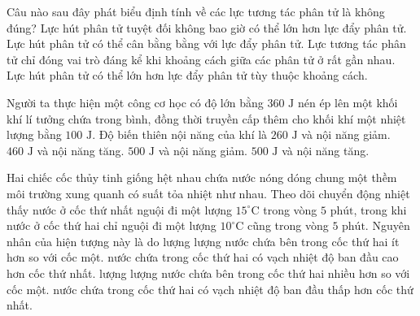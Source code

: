 \begin{ex}%
	Câu nào sau đây phát biểu định tính về các lực tương tác phân tử là không đúng?
	\choice
	{\True Lực hút phân tử tuyệt đối không bao giờ có thể lớn hơn lực đẩy phân tử.}
	{Lực hút phân tử có thể cân bằng bằng với lực đẩy phân tử.}
	{Lực tương tác phân tử chỉ đóng vai trò đáng kể khi khoảng cách giữa các phân tử ở rất gần nhau.}
	{Lực hút phân tử có thể lớn hơn lực đẩy phân tử tùy thuộc khoảng cách.}
\end{ex}

\begin{ex}%
	Người ta thực hiện một công cơ học có độ lớn bằng $360\text{ J}$ nén ép lên một khối khí lí tưởng chứa trong bình, đồng thời truyền cấp thêm cho khối khí một nhiệt lượng bằng $100\text{ J}$. Độ biến thiên nội năng của khí là
	\choice
	{$260\text{ J}$ và nội năng giảm.}
	{\True $460\text{ J}$ và nội năng tăng.}
	{$500\text{ J}$ và nội năng giảm.}
	{$500\text{ J}$ và nội năng tăng.}
\end{ex}

\begin{ex}%
	Hai chiếc cốc thủy tinh giống hệt nhau chứa nước nóng dóng chung một thềm môi trường xung quanh có suất tỏa nhiệt như nhau. Theo dõi chuyển động nhiệt thấy nước ở cốc thứ nhất nguội đi một lượng $15^\circ\text{C}$ trong vòng $5\text{ phút}$, trong khi nước ở cốc thứ hai chỉ nguội đi một lượng $10^\circ\text{C}$ cũng trong vòng $5\text{ phút}$. Nguyên nhân của hiện tượng này là do
	\choice
	{lượng lượng nước chứa bên trong cốc thứ hai ít hơn so với cốc một.}
	{nước chứa trong cốc thứ hai có vạch nhiệt độ ban đầu cao hơn cốc thứ nhất.}
	{lượng lượng nước chứa bên trong cốc thứ hai nhiều hơn so với cốc một.}
	{\True nước chứa trong cốc thứ hai có vạch nhiệt độ ban đầu thấp hơn cốc thứ nhất.}
\end{ex}

